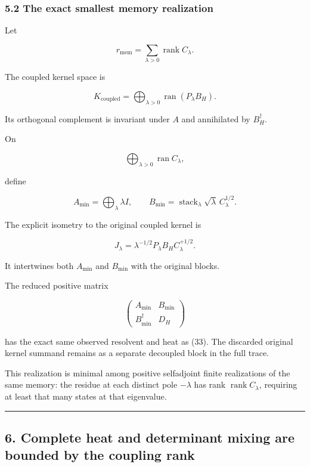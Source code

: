 \documentclass[11pt]{article}
\begin{document}
\subsubsection{5.2 The exact smallest memory realization}\label{the-exact-smallest-memory-realization}

Let

\[
r_{\mathrm{mem}}=\sum_{\lambda>0}\operatorname{rank}C_\lambda.
\]

The coupled kernel space is

\[
K_{\mathrm{coupled}}
=
\bigoplus_{\lambda>0}\operatorname{ran}(P_\lambda B_H).
\]

Its orthogonal complement is invariant under \(A\) and annihilated by \(B_H^\dagger\).

On

\[
\bigoplus_{\lambda>0}\operatorname{ran}C_\lambda,
\]

define

\[
A_{\min}=\bigoplus_\lambda\lambda I,
\qquad
B_{\min}=
\operatorname{stack}_\lambda\sqrt\lambda\,C_\lambda^{1/2}.
\]

The explicit isometry to the original coupled kernel is

\[
\boxed{
J_\lambda=
\lambda^{-1/2}P_\lambda B_HC_\lambda^{+1/2}.
}
\tag{42}
\]

It intertwines both \(A_{\min}\) and \(B_{\min}\) with the original blocks.

The reduced positive matrix

\[
\begin{pmatrix}
A_{\min}&B_{\min}\\
B_{\min}^\dagger&D_H
\end{pmatrix}
\]

has the exact same observed resolvent and heat as (33). The discarded original kernel summand remains as a separate decoupled block in the full trace.

This realization is minimal among positive selfadjoint finite realizations of the same memory: the residue at each distinct pole \(-\lambda\) has rank \(\operatorname{rank}C_\lambda\), requiring at least that many states at that eigenvalue.

\begin{center}\rule{0.5\linewidth}{0.5pt}\end{center}

\subsection{6. Complete heat and determinant mixing are bounded by the coupling rank}\label{complete-heat-and-determinant-mixing-are-bounded-by-the-coupling-rank}
\end{document}
